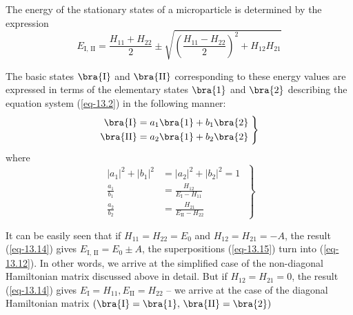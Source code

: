\documentclass[a4paper,sfsidenotes,colorlinks=true]{tufte-book}
\numberwithin{equation}{section}
\numberwithin{figure}{section}
\begin{document}
The energy of the stationary states of a microparticle is determined
by the expression
\begin{equation}%
E_{\mathrm{I, \, II}} = \frac{ H_{11}+H_{22}}{2} \pm \sqrt{\left( \frac{H_{11}-H_{22}}{2} \right)^{2}+H_{12}H_{21}}
\label{eq-13.14}
\end{equation}

The basic states $\bra{\mathrm{I}}$ and $\bra{\mathrm{II}}$
corresponding to these energy values are expressed in terms of the
elementary states $\bra{1}$ and $\bra{2}$ describing the equation
system (\ref{eq-13.2}) in the following manner:
\begin{equation}%
\left.
\begin{split}
\bra{\mathrm{I}} & = a_{1} \bra{1} + b_{1} \bra{2} \\
\bra{\mathrm{II}} & = a_{2} \bra{1} + b_{2} \bra{2}
\end{split}
\; \right\}
\label{eq-13.15}
\end{equation}
    where 
\begin{equation}%
\left.
\begin{split}
|a_{1}|^{2} + |b_{1}|^{2} & = |a_{2}|^{2} + |b_{2}|^{2} = 1\\
\frac{a_{1}}{b_{1}} & = \frac{H_{12}}{E_{\mathrm{I}} - H_{11}} \\
\frac{a_{2}}{b_{2}} & = \frac{H_{21}}{E_{\mathrm{II}} - H_{22}}
\end{split}
\; \right\}
\label{eq-13.16}
\end{equation}

It can be easily seen that if $H_{11} =H_{22} = E_{0}$ and $H_{12} =
H_{21} = - A$, the result (\ref{eq-13.14}) gives $E_{\mathrm{I, \,
    II}} = E_{0} \pm A$, the superpositions (\ref{eq-13.15}) turn into
(\ref{eq-13.12}). In other words, we arrive at the simplified case of the non-diagonal Hamiltonian matrix discussed above in detail. But if $H_{12} =
H_{21} = 0$, the result (\ref{eq-13.14}) gives $E_{\mathrm{I}} =
H_{11}, E_{\mathrm{II}} = H_{22}$ -- we arrive at
the case of the diagonal Hamiltonian matrix $\left( \bra{\mathrm{I}}
  =\bra{1}, \, \bra{\mathrm{II}} = \bra{2} \right)$
\end{document}

